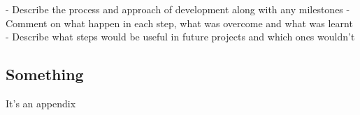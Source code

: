 \documentclass[11pt, a4paper]{article}
\begin{document}
- Describe the process and approach of development along with any milestones
- Comment on what happen in each step, what was overcome and what was learnt
- Describe what steps would be useful in future projects and which ones wouldn't

\cleardoublepage
\printbibliography[
  heading=bibintoc,
  title={Bibliography}
]

\cleardoublepage
\begin{appendices}

\section{Something}

It's an appendix

\end{appendices}
\end{document}
